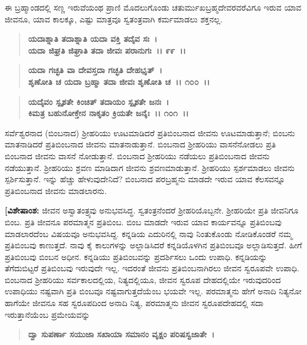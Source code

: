 ಈ ಬ್ರಹ್ಮಾಂಡದಲ್ಲಿ ಸಣ್ಣ ಇರುವೆಯಂಥ ಪ್ರಾಣಿ ಮೊದಲುಗೊಂಡು ಚತುರ್ಮುಖಬ್ರಹ್ಮದೇವರವರೆವಿಗೂ ಇರುವ ಯಾವ ಜೀವನೂ, ಯಾವ ಕಾಲಕ್ಕೂ, ಎಷ್ಟು ಮಾತ್ರವೂ ಸ್ವತಂತ್ರವಾಗಿ ಕರ್ಮಮಾಡಲು ಶಕ್ತನಲ್ಲ.

\begin{verse}
\textbf{ಯದಾಶ್ನಾತಿ ತದಾಶ್ನಾತಿ ಯದಾ ವಕ್ತಿ ತದೈವ ಸಃ~।}\\\textbf{ಯದಾ ಜಿಘ್ರತಿ ಜಿಘ್ರಾತಿ ತದಾ ಜೀವಃ ಪರಾನುಗಃ~।। ೯೯~।।} 
\end{verse}

\begin{verse}
\textbf{ಯದಾ ಗಚ್ಛತಿ ವಾ ದೇವಸ್ತದಾ ಗಚ್ಛತಿ ದೇಹಭೃತ್~।}\\\textbf{ಶೃಣೋತಿ ಚ ಯದಾ ಬ್ರಹ್ಮಾ ತದಾ ಜೀವಃ ಶೃಣೋತಿ ಚ~।। ೧೦೦~।।} 
\end{verse}

\begin{verse}
\textbf{ಯದೈವಂ ಸ್ಪೃಶತೇ ಕಿಂಚಿತ್ ತದಾಯಂ ಸ್ಪೃಶತೇ ಜನಃ~।}\\\textbf{ಕಿಮತ್ರ ಬಹುನೋಕ್ತೇನ ನಾಕೃತಂ ಕ್ರಿಯತೇ ಜನೈಃ~।। ೧೦೧~।।}
\end{verse}

ಸರ್ವೆಶ್ವರನಾದ (ಬಿಂಬನಾದ) ಶ‍್ರೀಹರಿಯು ಊಟಮಾಡಿದರೆ ಪ್ರತಿಬಿಂಬನಾದ ಜೀವನು ಊಟಮಾಡುತ್ತಾನೆ; ಬಿಂಬನು ಮಾತನಾಡಿದರೆ ಪ್ರತಿಬಿಂಬನಾದ ಜೀವನು ಮಾತ\-ನಾಡುತ್ತಾನೆ. ಬಿಂಬನಾದ ಶ‍್ರೀಹರಿಯು ವಾಸನೆನೋಡಲು ಪ್ರತಿ ಬಿಂಬನಾದ ಜೀವನು ವಾಸನೆ ನೋಡುತ್ತಾನೆ. ಬಿಂಬನಾದ ಶ‍್ರೀಹರಿಯು ನಡೆಯಲು ಪ್ರತಿಬಿಂಬನಾದ ಜೀವನು ನಡೆಯುತ್ತಾನೆ. ಶ‍್ರೀಹರಿಯು ಶ್ರವಣ ಮಾಡಿದಾಗ ಜೀವನು ಶ್ರವಣಮಾಡುತ್ತಾನೆ. ಶ‍್ರೀಹರಿಯು ಸ್ಪರ್ಶಮಾಡಲು ಜೀವನು ಸ್ಪರ್ಶಿಸುತ್ತಾನೆ. ಇನ್ನು ಹೆಚ್ಚು ಹೇಳುವುದೇನಿದೆ? ಬಿಂಬನಾದ ಪರಬ್ರಹ್ಮನು ಮಾಡದೇ ಇರುವ ಯಾವ ಕೆಲಸವನ್ನೂ ಪ್ರತಿಬಿಂಬನಾದ ಜೀವನು ಮಾಡಲಾರನು.

\textbf{[ವಿಶೇಷಾಂಶ:} ಜೀವನ ಅಸ್ವಾತಂತ್ರ್ಯವು ಅನುಭವಸಿದ್ಧ. ಸ್ವತಂತ್ರನೆಂದರೆ ಶ‍್ರೀಹರಿ\-ಯೊಬ್ಬನೇ. ಶ‍್ರೀಹರಿಯೇ ಪ್ರತಿ ಜೀವನಿಗೂ ಬಿಂಬ. ಪ್ರತಿ ಜೀವನೂ ಪರಮಾತ್ಮನ ಪ್ರತಿಬಿಂಬ. ಬಿಂಬ ಮಾಡದೇ ಇರುವ ಯಾವ ಕಾರ್ಯವನ್ನೂ ಪ್ರತಿಬಿಂಬವು ಮಾಡಲಾರದೆಂಬ ವಿಷಯವೂ ಅನುಭವಸಿದ್ದ. ಕನ್ನಡಿಯ ಎದುರಿನಲ್ಲಿ ನಾವು ನಿಂತುಕೊಂಡು ನೋಡಿಕೊಂಡರೆ ನಮ್ಮ ಪ್ರತಿಬಿಂಬವು ಕಾಣುತ್ತದೆ. ನಾವು ಕೈ ಕಾಲುಗಳನ್ನು ಅಲ್ಲಾಡಿಸಿದರೆ ಕನ್ನಡಿಯೊಳಗಿನ ಪ್ರತಿಬಿಂಬವೂ ಅಲ್ಲಾಡಿಸುತ್ತದೆ. ಹೀಗೆ ಪ್ರತಿಬಿಂಬವು ಬಿಂಬನ ಅಧೀನ. ಕನ್ನಡಿಯು ಪ್ರತಿಬಿಂಬವನ್ನು ಪ್ರದರ್ಶಿಸಲು ಒಂದು ಉಪಾಧಿ. ಕನ್ನಡಿಯನ್ನು ತೆಗೆದುಬಿಟ್ಟರೆ ಪ್ರತಿಬಿಂಬವು ಇರುವುದೇ ಇಲ್ಲ. ಇದರಂತೆ ಜೀವನು ಪ್ರತಿಬಿಂಬನಾಗಿರಲು ಜೀವನ ಸ್ವರೂಪವೇ ಉಪಾಧಿ. ಬಿಂಬನಾದ ಶ‍್ರೀಹರಿಯು ಸರ್ವಕಾಲದಲ್ಲಿಯ, ನಿತ್ಯದಲ್ಲಿಯೂ, ಜೀವನ ಸ್ವರೂಪ ದೇಹದಲ್ಲಿಯೇ ಇರುವುದರಿಂದ ಉಪಾಧಿಯು ನಷ್ಟವಾಗಿ ಪ್ರತಿ ಬಿಂಬವೂ ನಷ್ಟವಾಗುತ್ತದೆಯೆಂಬ ಭಯವೇ ಇಲ್ಲ. ಪರಮಾತ್ಮನು ಹೇಗೆ ಅನಾದಿ ನಿತ್ಯನೋ ಹಾಗೆಯೇ ಜೀವನೂ ಸಹ ಸ್ವರೂಪ\-ದಿಂದ ಅನಾದಿ ನಿತ್ಯ, ಪರಮಾತ್ಮನು ಜೀವನ ಸ್ವರೂಪದೇಹದಲ್ಲಿ ಸದಾ ಇರುತ್ತಾನೆಯೆಂಬ ಪ್ರಮೇಯವನ್ನು

\begin{verse}
\textbf{ದ್ವಾ ಸುಪರ್ಣಾ ಸಯುಜಾ ಸಖಾಯಾ ಸಮಾನಂ ವೃಕ್ಷಂ ಪರಿಷಸ್ವಜಾತೇ~।}
\end{verse}

